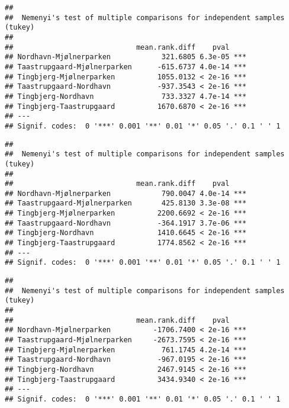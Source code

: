 \documentclass[
]{article}
\newenvironment{Shaded}{\begin{snugshade}}{\end{snugshade}}
\newcommand{\AttributeTok}[1]{\textcolor[rgb]{0.13,0.29,0.53}{#1}}
\newcommand{\FunctionTok}[1]{\textcolor[rgb]{0.13,0.29,0.53}{\textbf{#1}}}
\newcommand{\NormalTok}[1]{#1}
\newcommand{\SpecialCharTok}[1]{\textcolor[rgb]{0.81,0.36,0.00}{\textbf{#1}}}
\begin{document}
\begin{verbatim}
## 
##  Nemenyi's test of multiple comparisons for independent samples (tukey)  
## 
##                             mean.rank.diff    pval    
## Nordhavn-Mjølnerparken            321.6805 6.3e-05 ***
## Taastrupgaard-Mjølnerparken      -615.6737 4.0e-14 ***
## Tingbjerg-Mjølnerparken          1055.0132 < 2e-16 ***
## Taastrupgaard-Nordhavn           -937.3543 < 2e-16 ***
## Tingbjerg-Nordhavn                733.3327 4.7e-14 ***
## Tingbjerg-Taastrupgaard          1670.6870 < 2e-16 ***
## ---
## Signif. codes:  0 '***' 0.001 '**' 0.01 '*' 0.05 '.' 0.1 ' ' 1
\end{verbatim}

\begin{Shaded}
\end{Shaded}

\begin{verbatim}
## 
##  Nemenyi's test of multiple comparisons for independent samples (tukey)  
## 
##                             mean.rank.diff    pval    
## Nordhavn-Mjølnerparken            790.0047 4.0e-14 ***
## Taastrupgaard-Mjølnerparken       425.8130 3.3e-08 ***
## Tingbjerg-Mjølnerparken          2200.6692 < 2e-16 ***
## Taastrupgaard-Nordhavn           -364.1917 3.7e-06 ***
## Tingbjerg-Nordhavn               1410.6645 < 2e-16 ***
## Tingbjerg-Taastrupgaard          1774.8562 < 2e-16 ***
## ---
## Signif. codes:  0 '***' 0.001 '**' 0.01 '*' 0.05 '.' 0.1 ' ' 1
\end{verbatim}

\begin{Shaded}
\end{Shaded}

\begin{verbatim}
## 
##  Nemenyi's test of multiple comparisons for independent samples (tukey)  
## 
##                             mean.rank.diff    pval    
## Nordhavn-Mjølnerparken          -1706.7400 < 2e-16 ***
## Taastrupgaard-Mjølnerparken     -2673.7595 < 2e-16 ***
## Tingbjerg-Mjølnerparken           761.1745 4.2e-14 ***
## Taastrupgaard-Nordhavn           -967.0195 < 2e-16 ***
## Tingbjerg-Nordhavn               2467.9145 < 2e-16 ***
## Tingbjerg-Taastrupgaard          3434.9340 < 2e-16 ***
## ---
## Signif. codes:  0 '***' 0.001 '**' 0.01 '*' 0.05 '.' 0.1 ' ' 1
\end{verbatim}
\end{document}

